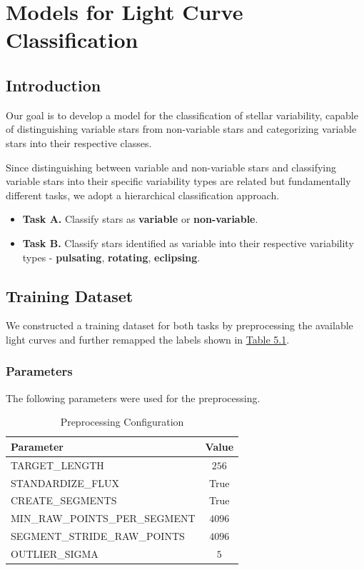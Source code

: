 \chapter{Models for Light Curve Classification}


\section{Introduction}

Our goal is to develop a model for the classification of stellar variability, capable of distinguishing variable stars from non-variable stars and categorizing variable stars into their respective classes.

Since distinguishing between variable and non-variable stars and classifying variable stars into their specific variability types are related but fundamentally different tasks, we adopt a hierarchical classification approach.

\begin{itemize}
    \item \textbf{Task A.} Classify stars as \textbf{variable} or \textbf{non-variable}.
    \item \textbf{Task B.} Classify stars identified as variable into their respective variability types - \textbf{pulsating}, \textbf{rotating}, \textbf{eclipsing}.
\end{itemize}


\section{Training Dataset}

We constructed a training dataset for both tasks by preprocessing the available light curves and further remapped the labels shown in \hyperref[tab:05_base_class_counts]{Table 5.1}.

\subsection{Parameters}

The following parameters were used for the preprocessing.

\begin{table}[H]
    \centering
    \scriptsize
    \renewcommand{\arraystretch}{1.2}
    \begin{tabularx}{\textwidth}{X c}
        \toprule
        \textbf{Parameter} & \textbf{Value} \tabularnewline
        \midrule
        TARGET\_LENGTH & $256$ \tabularnewline
        STANDARDIZE\_FLUX & True \tabularnewline
        CREATE\_SEGMENTS & True \tabularnewline
        MIN\_RAW\_POINTS\_PER\_SEGMENT    & $4096$ \tabularnewline
        SEGMENT\_STRIDE\_RAW\_POINTS  & $4096$ \tabularnewline
        OUTLIER\_SIGMA & $5$ \tabularnewline
        \bottomrule
    \end{tabularx}
    \caption[Preprocessing Configuration]{Preprocessing Configuration}
    \label{tab:06_preprocessing_configuration}
\end{table}

